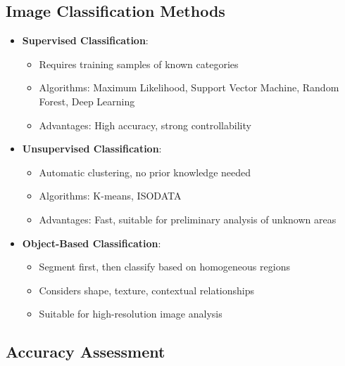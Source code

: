 \documentclass[
  letterpaper,
]{scrbook}
\providecommand{\tightlist}{%
  \setlength{\itemsep}{0pt}\setlength{\parskip}{0pt}}\usepackage{longtable,booktabs,array}
\begin{document}
\subsection{Image Classification
Methods}\label{image-classification-methods}

\begin{itemize}
\tightlist
\item
  \textbf{Supervised Classification}:

  \begin{itemize}
  \tightlist
  \item
    Requires training samples of known categories
  \item
    Algorithms: Maximum Likelihood, Support Vector Machine, Random
    Forest, Deep Learning
  \item
    Advantages: High accuracy, strong controllability
  \end{itemize}
\item
  \textbf{Unsupervised Classification}:

  \begin{itemize}
  \tightlist
  \item
    Automatic clustering, no prior knowledge needed
  \item
    Algorithms: K-means, ISODATA
  \item
    Advantages: Fast, suitable for preliminary analysis of unknown areas
  \end{itemize}
\item
  \textbf{Object-Based Classification}:

  \begin{itemize}
  \tightlist
  \item
    Segment first, then classify based on homogeneous regions
  \item
    Considers shape, texture, contextual relationships
  \item
    Suitable for high-resolution image analysis
  \end{itemize}
\end{itemize}

\subsection{Accuracy Assessment}\label{accuracy-assessment}
\end{document}

